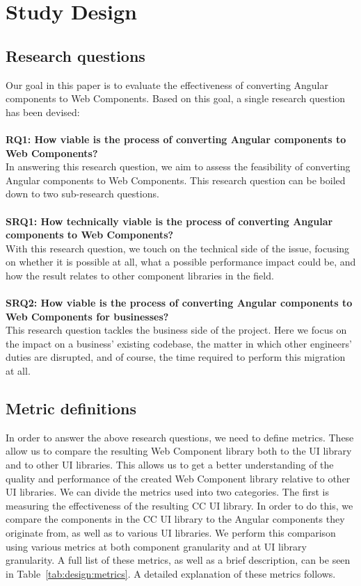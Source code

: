 \chapter{Study Design}\label{chap:design}

\section{Research questions}
Our goal in this paper is to evaluate the effectiveness of converting Angular components to Web Components. Based on this goal, a single research question has been devised:
\\
\\
\textbf{RQ1: How viable is the process of converting Angular components to Web Components?}
\\
In answering this research question, we aim to assess the feasibility of converting Angular components to Web Components. This research question can be boiled down to two sub-research questions.
\\
\\
\textbf{SRQ1: How technically viable is the process of converting Angular components to Web Components?}
\\
With this research question, we touch on the technical side of the issue, focusing on whether it is possible at all, what a possible performance impact could be, and how the result relates to other component libraries in the field.
\\
\\
\textbf{SRQ2: How viable is the process of converting Angular components to Web Components for businesses?}
\\
This research question tackles the business side of the project. Here we focus on the impact on a business' existing codebase, the matter in which other engineers' duties are disrupted, and of course, the time required to perform this migration at all.


\section{Metric definitions}
In order to answer the above research questions, we need to define metrics. These allow us to compare the resulting Web Component library both to the UI library and to other UI libraries. This allows us to get a better understanding of the quality and performance of the created Web Component library relative to other UI libraries. We can divide the metrics used into two categories. The first is measuring the effectiveness of the resulting CC UI library. In order to do this, we compare the components in the CC UI library to the Angular components they originate from, as well as to various UI libraries. We perform this comparison using various metrics at both component granularity and at UI library granularity. A full list of these metrics, as well as a brief description, can be seen in Table~\ref{tab:design:metrics}. A detailed explanation of these metrics follows.


